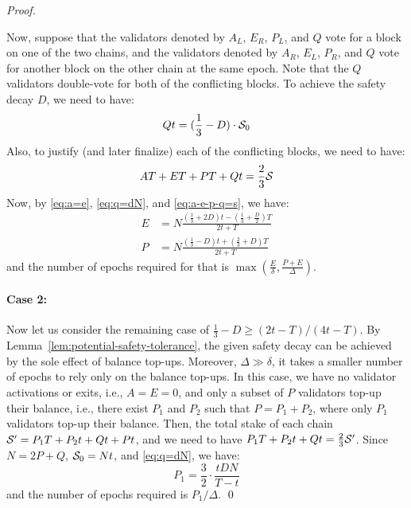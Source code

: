 \begin{proof}
\begin{center}
\end{center}
Now, suppose that the validators denoted by $A_L$, $E_R$, $P_L$, and $Q$ vote for a block on one of the two chains, and the validators denoted by $A_R$, $E_L$, $P_R$, and $Q$ vote for another block on the other chain at the same epoch.
Note that the $Q$ validators double-vote for both of the conflicting blocks.
To achieve the safety decay $D$, we need to have:
\begin{equation}\label{eq:q=dN}
Qt = (\frac{1}{3} - D) \cdot \mathcal{S}_0
\end{equation}
Also, to justify (and later finalize) each of the conflicting blocks, we need to have:
\begin{equation}\label{eq:a-e-p-q=s}
AT + ET + PT + Qt = \frac{2}{3} \mathcal{S}
\end{equation}
Now, by \eqref{eq:a=e}, \eqref{eq:q=dN}, and \eqref{eq:a-e-p-q=s}, we have:
\begin{align*}
E & = N \frac{(\frac{1}{3} + 2D)t - (\frac{1}{3} + \frac{D}{2})T}{2t+T} \\
P & = N \frac{(\frac{1}{3} - D)t + (\frac{2}{3} + D)T}{2t+T}
\end{align*}
and the number of epochs required for that is $\max(\frac{E}{\delta}, \frac{P+E}{\Delta})$.

\paragraph{Case 2:}

Now let us consider the remaining case of $\frac{1}{3} - D \ge (2t - T)/(4t - T)$.
By Lemma~\ref{lem:potential-safety-tolerance}, the given safety decay can be achieved by the sole effect of balance top-ups.
Moreover, $\Delta \gg \delta$, it takes a smaller number of epochs to rely only on the balance top-ups.
In this case, we have no validator activations or exits, i.e., $A = E = 0$, and only a subset of $P$ validators top-up their balance, i.e., there exist $P_1$ and $P_2$ such that $P = P_1 + P_2$, where only $P_1$ validators top-up their balance.
Then, the total stake of each chain $\mathcal{S}' = P_1 T + P_2 t + Qt + Pt$, and we need to have $P_1 T + P_2 t + Qt = \frac{2}{3} \mathcal{S}'$.
Since $N = 2P+Q$, $\mathcal{S}_0 = Nt$, and \eqref{eq:q=dN}, we have:
\[
P_1 = \frac{3}{2} \cdot \frac{tDN}{T-t}
\]
and the number of epochs required is $P_1 / \Delta$.
\qed
\end{proof}
